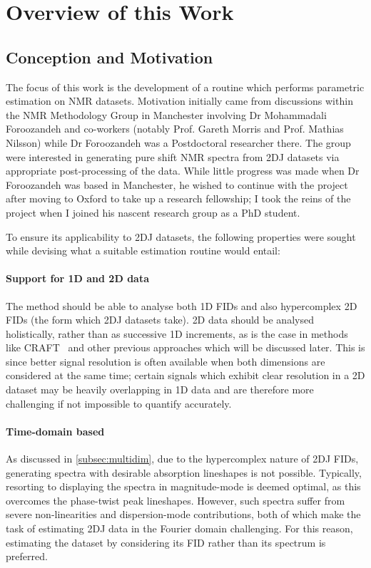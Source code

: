 \section{Overview of this Work}

\subsection{Conception and Motivation}
The focus of this work is the development of a routine which performs
parametric estimation on \ac{NMR} datasets.
Motivation initially came from discussions within the NMR
Methodology Group in Manchester involving
Dr Mohammadali Foroozandeh and co-workers (notably Prof.  Gareth Morris and
Prof. Mathias Nilsson) while Dr Foroozandeh was a
Postdoctoral researcher there. The group were interested in generating pure
shift \ac{NMR} spectra from \ac{2DJ} datasets via appropriate post-processing
of the data.  While little progress was made when Dr Foroozandeh was based in
Manchester, he wished to continue with the project after moving to Oxford to
take up a research fellowship; I took the reins of the project when I joined
his nascent research group as a PhD student.

To ensure its applicability to \ac{2DJ} datasets, the following properties were
sought while devising what a suitable estimation routine would entail:

\paragraph{Support for \ac{1D} and \ac{2D} data}
The method should be able to analyse both \ac{1D} \acp{FID} and also
hypercomplex \ac{2D} \acp{FID} (the form which \ac{2DJ} datasets take).
\ac{2D} data should be analysed holistically,
rather than as successive \ac{1D} increments, as is the case in methods like
\ac{CRAFT}~\cite{Krishnamurthy2017} and other previous approaches which will be
discussed later. This is since better signal resolution is often available when
both dimensions are considered at the same time; certain signals which exhibit
clear resolution in a \ac{2D} dataset may be heavily overlapping in \ac{1D}
data and are therefore more challenging if not impossible to quantify
accurately.

\paragraph{Time-domain based}
As discussed in \cref{subsec:multidim}, due to the hypercomplex nature of
\ac{2DJ} \acp{FID}, generating spectra with desirable absorption lineshapes is
not possible. Typically, resorting to displaying the spectra in magnitude-mode is
deemed optimal, as this overcomes the phase-twist peak lineshapes. However,
such spectra suffer from severe non-linearities and dispersion-mode
contributions, both of which make the task of estimating \ac{2DJ} data in the
Fourier domain challenging. For this reason, estimating the dataset by
considering its \ac{FID} rather than its spectrum is preferred.


